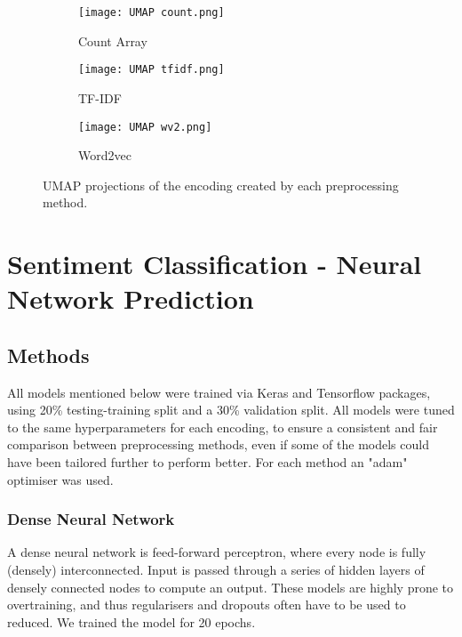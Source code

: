 \documentclass{article}
\begin{document}
\begin{figure}
     \centering
     \begin{subfigure}[b]{0.32\textwidth}
         \centering
         \texttt{[image: UMAP count.png]}\hspace{0cm}
         \caption{Count Array}
         \label{fig:UMAPa}
     \end{subfigure}
     \begin{subfigure}[b]{0.32\textwidth}
         \centering
         \texttt{[image: UMAP tfidf.png]}\hspace{-0.1cm}
         \caption{TF-IDF}
         \label{fig:UMAPb}
     \end{subfigure}
     \begin{subfigure}[b]{0.32\textwidth}
         \centering
         \texttt{[image: UMAP wv2.png]}
         \caption{Word2vec}
         \label{fig:UMAPc}
     \end{subfigure}
        \caption{UMAP projections of the encoding created by each preprocessing method.}
        \label{fig:UMAP}
\end{figure}

\section{Sentiment Classification - Neural Network Prediction}

\subsection*{Methods}

All models mentioned below were trained via Keras\cite{chollet2015keras} and Tensorflow\cite{tensorflow2015-whitepaper} packages, using 20\% testing-training split and a 30\% validation split. All models were tuned to the same hyperparameters for each encoding, to ensure a consistent and fair comparison between preprocessing methods, even if some of the models could have been tailored further to perform better. For each method an "adam" optimiser was used. 
\subsubsection*{Dense Neural Network}
A dense neural network is feed-forward perceptron, where every node is fully (densely) interconnected. Input is passed through a series of hidden layers of densely connected nodes to compute an output\cite{silge_2022}.
These models are highly prone to overtraining, and thus regularisers and dropouts often have to be used to reduced. We trained the model for 20 epochs.
\end{document}
